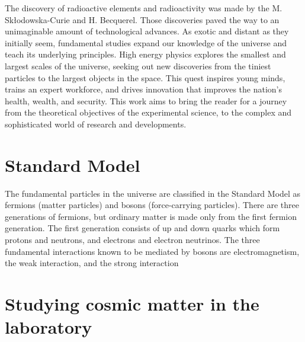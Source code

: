 
 The discovery of radioactive elements and radioactivity was made by the M. Skłodowska-Curie and H. Becquerel. Those discoveries paved the way to an unimaginable amount of technological advances. As exotic and distant as they initially seem, fundamental studies expand our knowledge of the universe and teach its underlying principles.
 High energy physics explores the smallest and largest scales of the universe, seeking out new discoveries from the tiniest particles to the largest objects in the space. This quest inspires young minds, trains an expert workforce, and drives innovation that improves the nation’s health, wealth, and security.
 This work aims to bring the reader for a journey from the theoretical objectives of the experimental science, to the complex and sophisticated world of research and developments. 
 
\section{Standard Model}
The fundamental particles in the universe are classified in the Standard Model as fermions (matter particles) and bosons (force-carrying particles). There are three generations of fermions, but ordinary matter is made only from the first fermion generation. The first generation consists of up and down quarks which form protons and neutrons, and electrons and electron neutrinos. The three fundamental interactions known to be mediated by bosons are electromagnetism, the weak interaction, and the strong interaction
\section{Studying cosmic matter in the laboratory}



